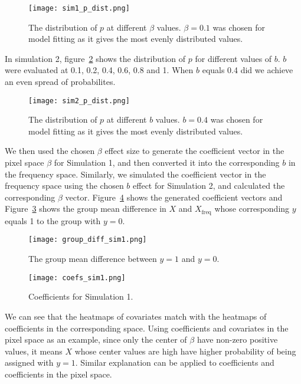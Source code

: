 \documentclass[12pt]{article}
\begin{document}
\begin{figure}[H] 
	\centering
	\texttt{[image: sim1\_p\_dist.png]} 
	\caption{The distribution of \(p\) at different \(\beta\) values. \(\beta = 0.1\) was
chosen for model fitting as it gives the most evenly distributed values.}
	\label{fig:sim1_p_dist} 
\end{figure}

In simulation 2, figure~\ref{fig:sim2_p_dist} shows the distribution of \( p \)
for different values of \( b \). \( b \) were evaluated at 0.1, 0.2, 0.4, 0.6,
0.8 and 1. When \( b \) equals 0.4 did we achieve an even spread of
probabilites.

\begin{figure}[H] 
	\centering
	\texttt{[image: sim2\_p\_dist.png]} 
	\caption{The distribution of \(p\) at different \( b \) values. \( b = 0.4 \) was
chosen for model fitting as it gives the most evenly distributed values.}
	\label{fig:sim2_p_dist} 
\end{figure}

We then used the chosen \( \beta \) effect size to generate the coefficient
vector in the pixel space \( \beta \) for Simulation 1, and then converted it
into the corresponding \( b \) in the frequency space. Similarly, we simulated
the coefficient vector in the frequency space using the chosen \( b \) effect
for Simulation 2, and calculated the corresponding \( \beta \) vector.
Figure~\ref{fig:coefs_sim1} shows the generated coefficient vectors and
Figure~\ref{fig:group_diff1} shows the group mean difference in \( X \) and 
\( X_{\text{freq}} \) whose corresponding \( y \) equals 1 to the group with
\( y=0 \).

\begin{figure}[h!]
	\centering
	\texttt{[image: group\_diff\_sim1.png]}
	\caption{The group mean difference between \( y = 1 \) and \( y = 0 \).}
	\label{fig:group_diff1}
\end{figure}

\begin{figure}[h!]
	\centering
	\texttt{[image: coefs\_sim1.png]}
  \caption{Coefficients for Simulation 1.}
  \label{fig:coefs_sim1}
\end{figure}

We can see that the heatmaps of covariates match with the heatmaps of
coefficients in the corresponding space. Using coefficients and covariates in
the pixel space as an example, since only the center of \( \beta \) have
non-zero positive values, it means \( X \) whose center values are high have
higher probability of being assigned with \( y=1 \). Similar explanation can
be applied to coefficients and coefficients in the pixel space. 
\end{document}
